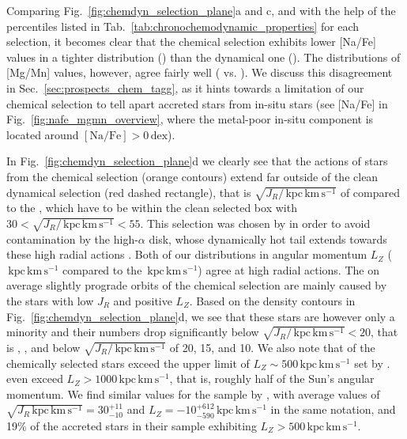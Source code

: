 \documentclass[fleqn,usenatbib]{mnras}
\newcommand{\dex}{\,\mathrm{dex}}	%
\newcommand{\kpckms}{\,\mathrm{kpc\,km\,s^{-1}}}	%
\begin{document}
Comparing Fig.~\ref{fig:chemdyn_selection_plane}a and c, and with the help of the percentiles listed in Tab.~\ref{tab:chronochemodynamic_properties} for each selection, it becomes clear that the chemical selection exhibits lower [Na/Fe] values in a tighter distribution () than the dynamical one (). The distributions of [Mg/Mn] values, however, agree fairly well ( vs. ). We discuss this disagreement in Sec.~\ref{sec:prospects_chem_tagg}, as it hints towards a limitation of our chemical selection to tell apart accreted stars from in-situ stars (see [Na/Fe] in Fig.~\ref{fig:nafe_mgmn_overview}, where the metal-poor in-situ component is located around $\mathrm{[Na/Fe]} > 0 \dex$).

In Fig.~\ref{fig:chemdyn_selection_plane}d we clearly see that the actions of stars from the chemical selection (orange contours) extend far outside of the clean dynamical selection (red dashed rectangle), that is $\sqrt{J_R / \kpckms}$ of  compared to the , which have to be within the clean selected box with $30 < \sqrt{J_R / \kpckms} < 55$. This selection was chosen by \citet{Feuillet2021} in order to avoid contamination by the high-$\alpha$ disk, whose dynamically hot tail extends towards these high radial actions \citep[e.g.][]{Feuillet2020, Das2020}. Both of our distributions in angular momentum $L_Z$ ($\kpckms$ compared to the $\kpckms$) agree at high radial actions. The on average slightly prograde orbits of the chemical selection are mainly caused by the stars with low $J_R$ and positive $L_Z$. Based on the density contours in Fig.~\ref{fig:chemdyn_selection_plane}d, we see that these stars are however only a minority and their numbers drop significantly below $\sqrt{J_R / \kpckms} < 20$, that is , , and  below $\sqrt{J_R / \kpckms}$ of 20, 15, and 10. We also note that  of the chemically selected stars exceed the upper limit of $L_Z \sim 500\kpckms$ set by \citet{Feuillet2021}.  even exceed $L_Z > 1000\kpckms$, that is, roughly half of the Sun's angular momentum. We find similar values for the sample by \citet{Das2020}, with average values of $\sqrt{J_R \kpckms} = 30_{-10}^{+11}$ and $L_Z = -10_{-590}^{+612} \kpckms$
in the same notation, and 19\% of the accreted stars in their sample exhibiting $L_Z > 500\kpckms$.
\end{document}
